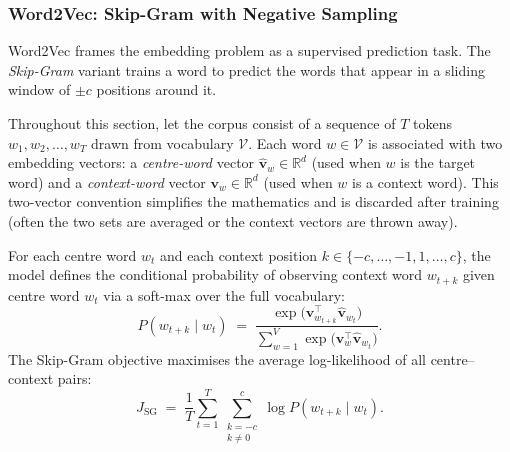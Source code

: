 \begin{deepdive}
\subsubsection{Word2Vec: Skip-Gram with Negative Sampling}

Word2Vec frames the embedding problem as a supervised prediction task.
The \emph{Skip-Gram} variant trains a word to predict the words that
appear in a sliding window of $\pm c$ positions around it.

Throughout this section, let the corpus consist of a sequence of $T$ tokens
$w_1, w_2, \dots, w_T$ drawn from vocabulary $\mathcal{V}$.  Each
word $w \in \mathcal{V}$ is associated with two embedding vectors:
a \emph{centre-word} vector $\hat{\mathbf{v}}_w \in \mathbb{R}^d$ (used when
$w$ is the target word) and a \emph{context-word} vector
$\mathbf{v}_w \in \mathbb{R}^d$ (used when $w$ is a context word).
This two-vector convention simplifies the mathematics and is discarded
after training (often the two sets are averaged or the context vectors
are thrown away).

For each centre word $w_t$ and each context position $k \in
\{-c, \ldots, -1, 1, \ldots, c\}$, the model defines the conditional
probability of observing context word $w_{t+k}$ given centre word
$w_t$ via a soft-max over the full vocabulary:
\begin{equation}
  P(w_{t+k} \mid w_t)
  \;=\;
  \frac{\exp\!\bigl(\mathbf{v}_{w_{t+k}}^{\top} \hat{\mathbf{v}}_{w_t}\bigr)}
       {\displaystyle\sum_{w=1}^{V} \exp\!\bigl(\mathbf{v}_{w}^{\top} \hat{\mathbf{v}}_{w_t}\bigr)}.
  \label{eq:skipgram-softmax}
\end{equation}
The Skip-Gram objective maximises the average log-likelihood of all
centre--context pairs:
\begin{equation}
  J_{\mathrm{SG}}
  \;=\;
  \frac{1}{T}
  \sum_{t=1}^{T}
  \sum_{\substack{k=-c \\ k \neq 0}}^{c}
  \log P(w_{t+k} \mid w_t).
  \label{eq:skipgram-obj}
\end{equation}


\end{deepdive}
